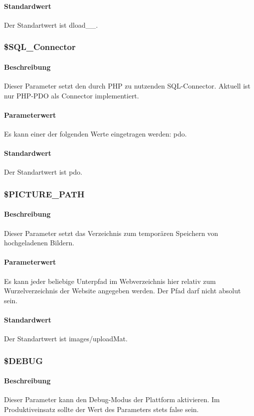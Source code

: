 \paragraph{Standardwert}Der Standartwert ist {\glqq dload\_\_\grqq}.

\subsubsection{\$SQL\_Connector}
\paragraph{Beschreibung}Dieser Parameter setzt den durch PHP zu nutzenden SQL-Connector. Aktuell ist nur PHP-PDO als Connector implementiert. 
\paragraph{Parameterwert}Es kann einer der folgenden Werte eingetragen werden: {\glqq pdo\grqq}.
\paragraph{Standardwert}Der Standartwert ist {\glqq pdo\grqq}.

\subsubsection{\$PICTURE\_PATH}
\paragraph{Beschreibung}Dieser Parameter setzt das Verzeichnis zum temporären Speichern von hochgeladenen Bildern.
\paragraph{Parameterwert}Es kann jeder beliebige Unterpfad im Webverzeichnis hier relativ zum Wurzelverzeichnis der Website angegeben werden. Der Pfad darf nicht absolut sein.
\paragraph{Standardwert}Der Standartwert ist {\glqq images/uploadMat\grqq}.

\subsubsection{\$DEBUG}
\paragraph{Beschreibung}Dieser Parameter kann den Debug-Modus der Plattform aktivieren. Im Produktiveinsatz sollte der Wert des Parameters stets {\glqq false\grqq} sein.
